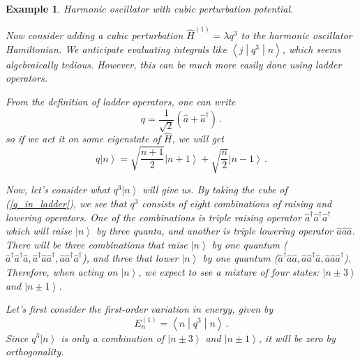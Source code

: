 \documentclass{article}
\theoremstyle{plain}\theoremheaderfont{\normalfont\itshape}\theorembodyfont{\rmfamily}\theoremseparator{.}\newtheorem*{rem}{Remark}\newtheorem*{ex}{Example}\newtheorem*{proof}{Proof}\newtheorem*{altp}{Alternative proof}
\theoremstyle{plain}\theoremheaderfont{\normalfont\bfseries}\theorembodyfont{\rmfamily}\theoremseparator{.}\newtheorem{thm}{Theorem}[section]\newtheorem{lem}[thm]{Lemma}\newtheorem{prop}[thm]{Proposition}\newtheorem*{cor}{Corollary}\newtheorem{defn}[thm]{Definition}\newtheorem{clm}[thm]{Claim}\newtheorem{clminproof}{Claim}
\theoremstyle{break}\theoremheaderfont{\normalfont\itshape}\theorembodyfont{\rmfamily}\theoremseparator{.\medskip}\newtheorem*{proofskip}{Proof}\newtheorem*{exs}{Examples}\newtheorem*{rems}{Remarks}
\theoremstyle{break}\theoremheaderfont{\normalfont\bfseries}\theorembodyfont{\rmfamily}\theoremseparator{.\medskip}\newtheorem{lemskip}[thm]{Lemma}\newtheorem{defnskip}[thm]{Definition}\newtheorem{propskip}[thm]{Proposition}\newtheorem{thmskip}[thm]{Theorem}
\numberwithin{equation}{section}
\newcommand{\ket}[1]{\left| #1 \right\rangle}
\newcommand{\mel}[3]{\left\langle #1 \middle| #2 \middle| #3 \right\rangle}
\begin{document}
    \begin{ex}
        \textit{Harmonic oscillator with cubic perturbation potential.}

        Now consider adding a cubic perturbation \(\hat{H}^{(1)}=\lambda q^3\) to the harmonic oscillator Hamiltonian. We anticipate evaluating integrals like \(\mel{j}{q^3}{n}\), which seems algebraically tedious. However, this can be much more easily done using ladder operators.

        From the definition of ladder operators, one can write
        \begin{equation}\label{q_in_ladder}
            q=\frac{1}{\sqrt{2}}(\hat{a}+\hat{a}^\dagger)\,.
        \end{equation}
        so if we act it on some eigenstate of \(\hat{H}\), we will get
        \begin{equation}
            q\ket{n}=\sqrt{\frac{n+1}{2}}\ket{n+1}+\sqrt{\frac{n}{2}}\ket{n-1}\,.
        \end{equation}

        Now, let's consider what \(q^3\ket{n}\) will give us. By taking the cube of (\ref{q_in_ladder}), we see that \(q^3\) consists of eight combinations of raising and lowering operators. One of the combinations is triple raising operator \(\hat{a}^\dagger\hat{a}^\dagger\hat{a}^\dagger\) which will raise \(\ket{n}\) by three quanta, and another is triple lowering operator \(\hat{a}\hat{a}\hat{a}\). There will be three combinations that raise \(\ket{n}\) by one quantum (\(\hat{a}^\dagger\hat{a}^\dagger\hat{a},\hat{a}^\dagger\hat{a}\hat{a}^\dagger,\hat{a}\hat{a}^\dagger\hat{a}^\dagger\)), and three that lower \(\ket{n}\) by one quantum (\(\hat{a}^\dagger\hat{a}\hat{a},\hat{a}\hat{a}^\dagger\hat{a},\hat{a}\hat{a}\hat{a}^\dagger\)). Therefore, when acting on \(\ket{n}\), we expect to see a mixture of four states: \(\ket{n\pm 3}\) and \(\ket{n\pm 1}\).

        Let's first consider the first-order variation in energy, given by
        \begin{equation}
            E_n^{(1)}=\mel{n}{q^3}{n}\,.
        \end{equation}
        Since \(q^3\ket{n}\) is only a combination of \(\ket{n\pm 3}\) and \(\ket{n\pm 1}\), it will be zero by orthogonality.


\end{ex}
\end{document}
